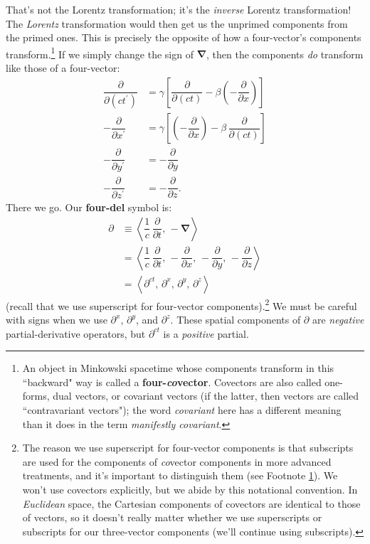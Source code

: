 \documentclass[12pt]{article}
\newcommand{\del}{\boldsymbol{\nabla}}
\begin{document}
That's not the Lorentz transformation; it's the \emph{inverse} Lorentz transformation! The \emph{Lorentz} transformation would then get us the unprimed components from the primed ones. This is precisely the opposite of how a four-vector's components transform.\footnote{\label{fn:cv}An object in Minkowski spacetime whose components transform in this ``backward" way is called a \textbf{four-\emph{co}vector}. Covectors are also called one-forms, dual vectors, or covariant vectors (if the latter, then vectors are called ``contravariant vectors"); the word \emph{covariant} here has a different meaning than it does in the term \emph{manifestly covariant}.} If we simply change the sign of $\del$, then the components \emph{do} transform like those of a four-vector:
\begin{equation*}
\begin{split}
\dfrac{\partial}{\partial (ct^\prime)} &= \gamma \left[ \dfrac{\partial}{\partial (ct)} - \beta \left(- \dfrac{\partial}{\partial x} \right) \right] \\[3pt]
- \dfrac{\partial}{\partial x^\prime} &= \gamma \left[ \left( - \dfrac{\partial}{\partial x} \right) - \beta \, \dfrac{\partial}{\partial (ct)}  \right] \\[3pt]
- \dfrac{\partial}{\partial y^\prime} &= - \dfrac{\partial}{\partial y} \\[3pt]
- \dfrac{\partial}{\partial z^\prime} &= - \dfrac{\partial}{\partial z} .
\end{split}
\end{equation*}
There we go. Our \textbf{four-del} symbol is:
\begin{equation}\label{eq:fn}
\boxed{
\begin{aligned}
\partialup &\equiv \left \langle \dfrac{1}{c} \, \dfrac{\partial}{\partial t} , \, - \del \right \rangle \\[3pt]
&= \left \langle \dfrac{1}{c} \, \dfrac{\partial}{\partial t} , \, - \dfrac{\partial}{\partial x}, \, - \dfrac{\partial}{\partial y}, \, - \dfrac{\partial}{\partial z} \right \rangle \\[3pt]
&=  \left \langle \partial^{ct}, \, \partial^x , \, \partial^y , \, \partial^z \right \rangle
\end{aligned}
}
\end{equation}
(recall that we use superscript for four-vector components).\footnote{The reason we use superscript for four-vector components is that subscripts are used for the components of \emph{co}vector components in more advanced treatments, and it's important to distinguish them (see Footnote \ref{fn:cv}). We won't use covectors explicitly, but we abide by this notational convention. In \emph{Euclidean} space, the Cartesian components of covectors are identical to those of vectors, so it doesn't really matter whether we use superscripts or subscripts for our three-vector components (we'll continue using subscripts).} We must be careful with signs when we use $\partial^x$, $\partial^y$, and $\partial^z$. These spatial components of $\partialup$ are \emph{negative} partial-derivative operators, but $\partial^{ct}$ is a \emph{positive} partial.
\end{document}
